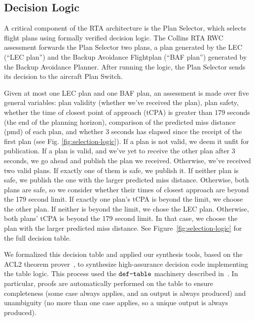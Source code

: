 \subsection{Decision Logic}




A critical component of the RTA architecture is the Plan Selector, which selects flight
plans using formally verified decision logic. The Collins RTA RWC assessment
forwards the Plan Selector two plans, a plan generated by the LEC (``LEC plan'') and
the Backup Avoidance Flightplan (``BAF plan'') generated by the Backup Avoidance
Planner. After running the logic, the Plan Selector sends its decision to the
aircraft Plan Switch.

Given at most one LEC plan and one BAF plan, an assessment is made over five
general variables: plan validity (whether we've received the plan), plan
safety, whether the time of closest point of approach (tCPA) is greater than
179 seconds (the end of the planning horizon), comparison of the predicted miss
distance (pmd) of each plan, and whether 3 seconds has elapsed since the
receipt of the first plan (see Fig. \ref{fig:selection-logic}). If a plan is
not valid, we deem it unfit for publication.  If a plan is valid, and we've yet
to receive the other plan after 3 seconds, we go ahead and publish the plan we
received.  Otherwise, we've received two valid plans.  If exactly one of them
is safe, we publish it.  If neither plan is safe, we publish the one with the
larger predicted miss distance.  Otherwise, both plans are safe, so we consider
whether their times of closest approach are beyond the 179 second limit.  If
exactly one plan's tCPA is beyond the limit, we choose the other plan.  If
neither is beyond the limit, we chose the LEC plan.  Otherwise, both plans'
tCPA is beyond the 179 second limit.  In that case, we choose the plan with the
larger predicted miss distance.  See Figure~\ref{fig:selection-logic} for the
full decision table.

We formalized this decision table and applied our synthesis tools, based on the
ACL2 theorem prover~\cite{acl2}, to synthesize high-assurance decision code
implementing the table logic.  This process used the $\verb+def-table+$
machinery described in~\cite{dasc2020}.  In particular, proofs are
automatically performed on the table to ensure completeness (some case always
applies, and an output is always produced) and unambiguity (no more than one
case applies, so a unique output is always produced).

